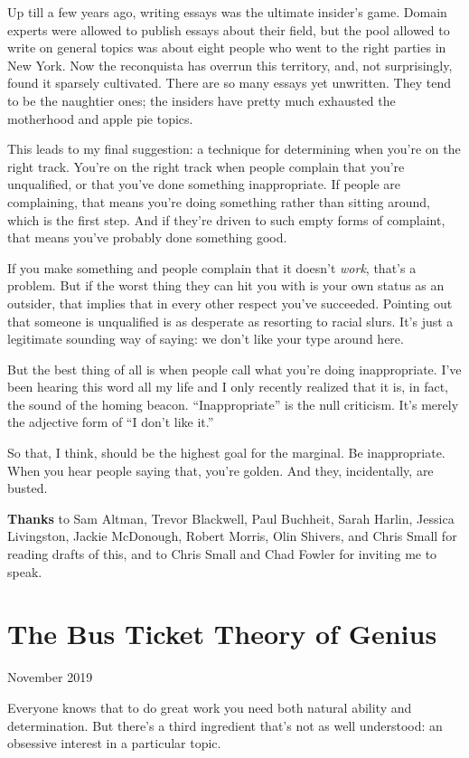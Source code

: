 \documentclass[12pt]{book}
\begin{document}
Up till a few years ago, writing essays was the ultimate insider's game.
Domain experts were allowed to publish essays about their field, but the
pool allowed to write on general topics was about eight people who went
to the right parties in New York. Now the reconquista has overrun this
territory, and, not surprisingly, found it sparsely cultivated. There
are so many essays yet unwritten. They tend to be the naughtier ones;
the insiders have pretty much exhausted the motherhood and apple pie
topics.

This leads to my final suggestion: a technique for determining when
you're on the right track. You're on the right track when people
complain that you're unqualified, or that you've done something
inappropriate. If people are complaining, that means you're doing
something rather than sitting around, which is the first step. And if
they're driven to such empty forms of complaint, that means you've
probably done something good.

If you make something and people complain that it doesn't \emph{work},
that's a problem. But if the worst thing they can hit you with is your
own status as an outsider, that implies that in every other respect
you've succeeded. Pointing out that someone is unqualified is as
desperate as resorting to racial slurs. It's just a legitimate sounding
way of saying: we don't like your type around here.

But the best thing of all is when people call what you're doing
inappropriate. I've been hearing this word all my life and I only
recently realized that it is, in fact, the sound of the homing beacon.
``Inappropriate'' is the null criticism. It's merely the adjective form
of ``I don't like it.''

So that, I think, should be the highest goal for the marginal. Be
inappropriate. When you hear people saying that, you're golden. And
they, incidentally, are busted.


\textbf{Thanks} to Sam Altman, Trevor Blackwell, Paul Buchheit, Sarah
Harlin, Jessica Livingston, Jackie McDonough, Robert Morris, Olin
Shivers, and Chris Small for reading drafts of this, and to Chris Small
and Chad Fowler for inviting me to speak.
\chapter{The Bus Ticket Theory of Genius}

November 2019

Everyone knows that to do great work you need both natural ability and
determination. But there's a third ingredient that's not as well
understood: an obsessive interest in a particular topic.
\end{document}
